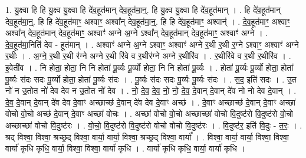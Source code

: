 \documentclass[17pt]{extarticle}
\begin{document}
1. यु॒क्ष्वा हि हि यु॒क्ष्व यु॒क्ष्वा हि दे॑व॒हूत॑मान् देव॒हूत॑मा॒न्॒. हि यु॒क्ष्व यु॒क्ष्वा हि दे॑व॒हूत॑मान् । . हि दे॑व॒हूत॑मान् देव॒हूत॑मा॒न्॒. हि हि दे॑व॒हूत॑माꣳ॒॒ अश्वाꣳ॒॒ अश्वा᳚न् देव॒हूत॑मा॒न्॒. हि हि दे॑व॒हूत॑माꣳ॒॒ अश्वान्॑ । . दे॒व॒हूत॑माꣳ॒॒ अश्वाꣳ॒॒ अश्वा᳚न् देव॒हूत॑मान् देव॒हूत॑माꣳ॒॒ अश्वाꣳ॑ अग्ने अ॒ग्ने ऽश्वा᳚न् देव॒हूत॑मान् देव॒हूत॑माꣳ॒॒ अश्वाꣳ॑ अग्ने । . दे॒व॒हूत॑मा॒निति॑ देव - हूत॑मान् । . अश्वाꣳ॑ अग्ने अ॒ग्ने ऽश्वाꣳ॒॒ अश्वाꣳ॑ अग्ने र॒थी र॒थी र॒ग्ने ऽश्वाꣳ॒॒ अश्वाꣳ॑ अग्ने र॒थीः । . अ॒ग्ने॒ र॒थी र॒थी र॑ग्ने अग्ने र॒थी रि॑वे व र॒थीर॑ग्ने अग्ने र॒थीरि॑व । . र॒थीरि॑वे व र॒थी र॒थीरि॑व । . इ॒वेती॑व । . नि होता॒ होता॒ नि नि होता॑ पू॒र्व्यः पू॒र्व्यो होता॒ नि नि होता॑ पू॒र्व्यः । . होता॑ पू॒र्व्यः पू॒र्व्यो होता॒ होता॑ पू॒र्व्यः स॑दः सदः पू॒र्व्यो होता॒ होता॑ पू॒र्व्यः स॑दः । . पू॒र्व्यः स॑दः सदः पू॒र्व्यः पू॒र्व्यः स॑दः । . स॒द॒ इति॑ सदः । . उ॒त नो॑ न उ॒तोत नो॑ देव देव न उ॒तोत नो॑ देव । . नो॒ दे॒व॒ दे॒व॒ नो॒ नो॒ दे॒व॒ दे॒वान् दे॒वान् दे॑व नो नो देव दे॒वान् । . दे॒व॒ दे॒वान् दे॒वान् दे॑व देव दे॒वाꣳ अच्छाच्छ॑ दे॒वान् दे॑व देव दे॒वाꣳ अच्छ॑ । . दे॒वाꣳ अच्छाच्छ॑ दे॒वान् दे॒वाꣳ अच्छा॑ वोचो वो॒चो अच्छ॑ दे॒वान् दे॒वाꣳ अच्छा॑ वोचः । . अच्छा॑ वोचो वो॒चो अच्छाच्छा॑ वोचो वि॒दुष्ट॑रो वि॒दुष्ट॑रो वो॒चो अच्छाच्छा॑ वोचो वि॒दुष्ट॑रः । . वो॒चो॒ वि॒दुष्ट॑रो वि॒दुष्ट॑रो वोचो वोचो वि॒दुष्ट॑रः । . वि॒दुष्ट॑र॒ इति॑ वि॒दुः - त॒रः॒ । . श्रद् विश्वा॒ विश्वा॒ श्रच्छ्रद् विश्वा॒ वार्या॒ वार्या॒ विश्वा॒ श्रच्छ्रद् विश्वा॒ वार्या᳚ । . विश्वा॒ वार्या॒ वार्या॒ विश्वा॒ विश्वा॒ वार्या॑ कृधि कृधि॒ वार्या॒ विश्वा॒ विश्वा॒ वार्या॑ कृधि । . वार्या॑ कृधि कृधि॒ वार्या॒ वार्या॑ कृधि । \newline
\end{document}
